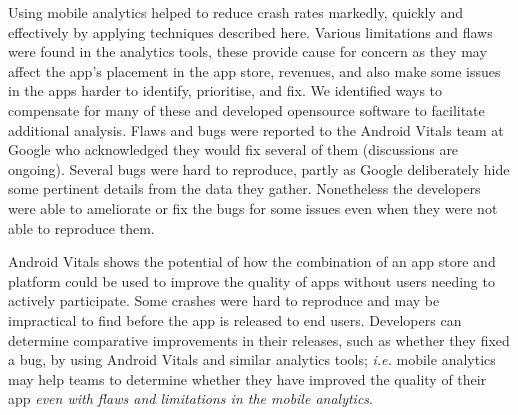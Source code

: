 \begin{SingleSpace}
Using mobile analytics helped to reduce crash rates markedly, quickly and effectively by applying techniques described here.
Various limitations and flaws were found in the analytics tools, these provide cause for concern as they may affect the app's placement in the app store, revenues, and also make some issues in the apps harder to identify, prioritise, and fix. We identified ways to compensate for many of these and developed opensource software to facilitate additional analysis. Flaws and bugs were reported to the Android Vitals team at Google who acknowledged they would fix several of them (discussions are ongoing).
Several bugs were hard to reproduce, partly as Google deliberately hide some pertinent details from the data they gather. Nonetheless the developers were able to ameliorate or fix the bugs for some issues even when they were not able to reproduce them. 

Android Vitals shows the potential of how the combination of an app store and platform could be used to improve the quality of apps without users needing to actively participate. Some crashes were hard to reproduce and may be impractical to find before the app is released to end users. Developers can determine comparative improvements in their releases, such as whether they fixed a bug, by using Android Vitals and similar analytics tools; \textit{i.e.} mobile analytics may help teams to determine whether they have improved the quality of their app \textit{even with flaws and limitations in the mobile analytics}.
\end{SingleSpace}
\newpage
